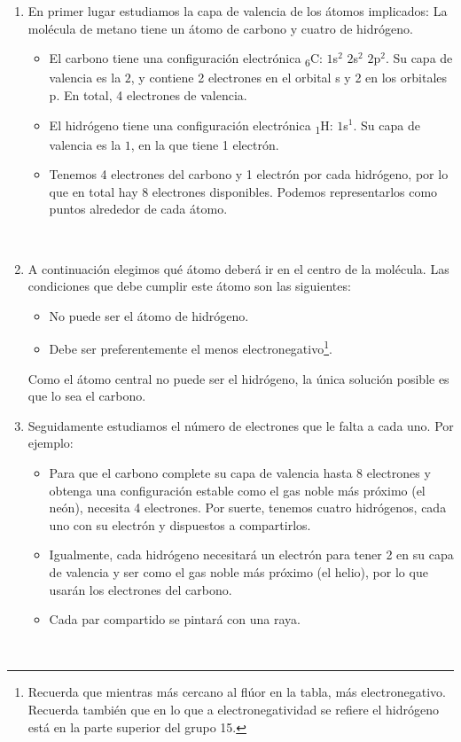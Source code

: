 \documentclass[twoside,a4paper,justified,12pt]{tufte-handout}
\renewcommand{\sb}[1]{\textsubscript{#1}}
\begin{document}
\begin{enumerate}[1)]
    \item En primer lugar estudiamos la capa de valencia de los átomos implicados: La molécula de metano tiene un átomo de carbono y cuatro de hidrógeno.
    \begin{itemize}
        \item El carbono tiene una configuración electrónica \sb{6}C: $1$s$^2$ $2$s$^2$ $2$p$^2$. Su capa de valencia es la $2$, y contiene 2 electrones en el orbital s y 2 en los orbitales p. En total, 4 electrones de valencia.
        \item El hidrógeno tiene una configuración electrónica \sb{1}H: $1$s$^1$. Su capa de valencia es la $1$, en la que tiene 1 electrón.
        \item Tenemos 4 electrones del carbono y 1 electrón por cada hidrógeno, por lo que en total hay 8 electrones disponibles. Podemos representarlos como puntos alrededor de cada átomo.
    \end{itemize}
    
    {\centering{}\hspace{2em}\\}
    
    \item A continuación elegimos qué átomo deberá ir en el centro de la molécula. Las condiciones que debe cumplir este átomo son las siguientes:
    \begin{itemize}
        \item No puede ser el átomo de hidrógeno.
        \item Debe ser preferentemente el menos electronegativo\footnote{Recuerda que mientras más cercano al flúor en la tabla, más electronegativo. Recuerda también que en lo que a electronegatividad se refiere el hidrógeno está en la parte superior del grupo 15.}.
    \end{itemize}
    Como el átomo central no puede ser el hidrógeno, la única solución posible es que lo sea el carbono.
    
    \item Seguidamente estudiamos el número de electrones que le falta a cada uno. Por ejemplo:
    \begin{itemize}
        \item Para que el carbono complete su capa de valencia hasta 8 electrones y obtenga una configuración estable como el gas noble más próximo (el neón), necesita 4 electrones. Por suerte, tenemos cuatro hidrógenos, cada uno con su electrón y dispuestos a compartirlos.
        \item Igualmente, cada hidrógeno necesitará un electrón para tener 2 en su capa de valencia y ser como el gas noble más próximo (el helio), por lo que usarán los electrones del carbono.
        \item Cada par compartido se pintará con una raya.
    \end{itemize}
    
     {\centering{}\\}
    
\end{enumerate}
\end{document}
